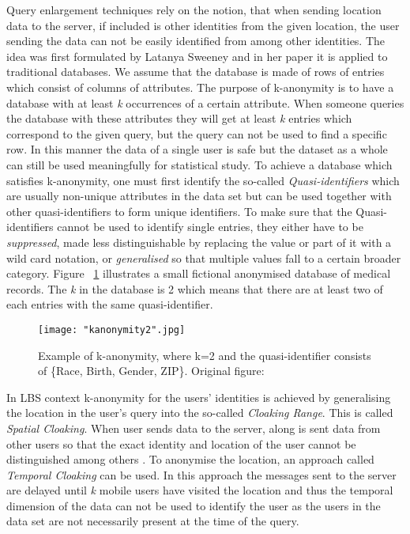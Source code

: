 \documentclass[english]{tktltiki2}
\theoremstyle{definition}
\theoremstyle{remark}
\begin{document}
Query enlargement techniques rely on the notion, that when sending location data to the server, if included is other identities from the given location, the user sending the data can not be easily identified from among other identities. The idea was first formulated by Latanya Sweeney\cite{Sweeney:2002:KAM:774544.774552} and in her paper it is applied to traditional databases. We assume that the database is made of rows of entries which consist of columns of attributes. The purpose of k-anonymity is to have a database with at least \textit{k} occurrences of a certain attribute. When someone queries the database with these attributes they will get at least \textit{k} entries which correspond to the given query, but the query can not be used to find a specific row. In this manner the data of a single user is safe but the dataset as a whole can still be used meaningfully for statistical study. To achieve a database which satisfies k-anonymity, one must first identify the so-called \textit{Quasi-identifiers} which are usually non-unique attributes in the data set but can be used together with other quasi-identifiers to form unique identifiers. To make sure that the Quasi-identifiers cannot be used to identify single entries, they either have to be \textit{suppressed}, made less distinguishable by replacing the value or part of it with a wild card notation, or \textit{generalised} so that multiple values fall to a certain broader category. Figure ~\ref{fig:kanonymity2} illustrates a small fictional anonymised database of medical records. The \textit{k} in the database is 2 which means that there are at least two of each entries with the same quasi-identifier.

\begin{figure}[H]
\centering
{}
\texttt{[image: "kanonymity2".jpg]}
\caption{Example of k-anonymity, where k=2 and the quasi-identifier consists of \{Race, Birth, Gender, ZIP\}. Original figure: \cite{Sweeney:2002:KAM:774544.774552} }
\label{fig:kanonymity2}
\end{figure} 

In LBS context k-anonymity for the users' identities is achieved by generalising the location in the user's query into the so-called \textit{Cloaking Range}. This is called \textit{Spatial Cloaking}. When user sends data to the server, along is sent data from other users so that the exact identity and location of the user cannot be distinguished among others \cite{Gedik2008}. To anonymise the location, an approach called \textit{Temporal Cloaking} can be used. In this approach the messages sent to the server are delayed until \textit{k} mobile users have visited the location and thus the temporal dimension of the data can not be used to identify the user as the users in the data set are not necessarily present at the time of the query.
\end{document}
